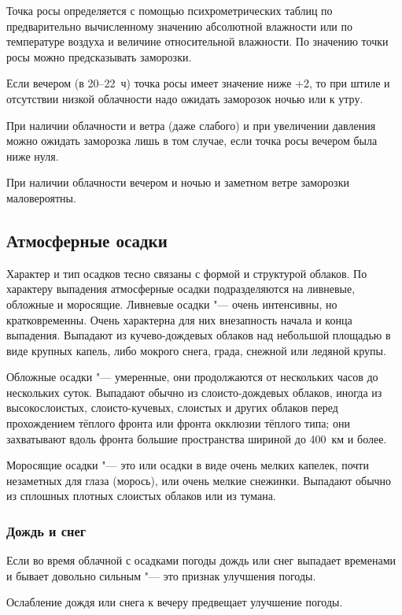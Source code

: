 Точка росы определяется с помощью психрометрических таблиц по
предварительно вычисленному значению абсолютной влажности или по
температуре воздуха и величине относительной влажности. По значению
точки росы можно предсказывать заморозки.

 Если вечером (в 20--22~ч) точка росы имеет значение ниже +2\grC, то
при штиле и отсутствии низкой облачности надо ожидать заморозок ночью
или к утру.

 При наличии облачности и ветра (даже слабого) и при увеличении
давления можно ожидать заморозка лишь в том случае, если точка росы
вечером была ниже нуля.

 При наличии облачности вечером и ночью и заметном ветре
заморозки маловероятны.

\subsection{Атмосферные осадки}

Характер и тип осадков тесно связаны с формой и структурой облаков. По
характеру выпадения атмосферные осадки подразделяются на ливневые,
обложные и моросящие. Ливневые осадки "--- очень интенсивны, но
кратковременны. Очень характерна для них внезапность начала и конца
выпадения. Выпадают из кучево-дождевых облаков над небольшой площадью
в виде крупных капель, либо мокрого снега, града, снежной или ледяной
крупы.

Обложные осадки "--- умеренные, они продолжаются от нескольких часов до
нескольких суток. Выпадают обычно из слоисто-дождевых облаков, иногда
из высокослоистых, слоисто-кучевых, слоистых и других облаков перед
прохождением тёплого фронта или фронта окклюзии тёплого типа; они
захватывают вдоль фронта большие пространства шириной до 400~км и
более.

Моросящие осадки "--- это или осадки в виде очень мелких капелек, почти
незаметных для глаза (морось), или очень мелкие снежинки. Выпадают
обычно из сплошных плотных слоистых облаков или из тумана.

\subsubsection{Дождь и снег}

 Если во время облачной с осадками погоды дождь или снег выпадает
временами и бывает довольно сильным "--- это признак улучшения погоды.

 Ослабление дождя или снега к вечеру предвещает улучшение погоды.

